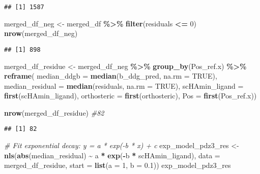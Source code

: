 \documentclass[
]{article}
\newenvironment{Shaded}{\begin{snugshade}}{\end{snugshade}}
\newcommand{\AttributeTok}[1]{\textcolor[rgb]{0.13,0.29,0.53}{#1}}
\newcommand{\CommentTok}[1]{\textcolor[rgb]{0.56,0.35,0.01}{\textit{#1}}}
\newcommand{\ConstantTok}[1]{\textcolor[rgb]{0.56,0.35,0.01}{#1}}
\newcommand{\DecValTok}[1]{\textcolor[rgb]{0.00,0.00,0.81}{#1}}
\newcommand{\FloatTok}[1]{\textcolor[rgb]{0.00,0.00,0.81}{#1}}
\newcommand{\FunctionTok}[1]{\textcolor[rgb]{0.13,0.29,0.53}{\textbf{#1}}}
\newcommand{\NormalTok}[1]{#1}
\newcommand{\OtherTok}[1]{\textcolor[rgb]{0.56,0.35,0.01}{#1}}
\newcommand{\SpecialCharTok}[1]{\textcolor[rgb]{0.81,0.36,0.00}{\textbf{#1}}}
\begin{document}
\begin{verbatim}
## [1] 1587
\end{verbatim}

\begin{Shaded}
\begin{Highlighting}[]
\NormalTok{merged\_df\_neg }\OtherTok{\textless{}{-}}\NormalTok{ merged\_df }\SpecialCharTok{\%\textgreater{}\%} \FunctionTok{filter}\NormalTok{(residuals }\SpecialCharTok{\textless{}=} \DecValTok{0}\NormalTok{)}
\FunctionTok{nrow}\NormalTok{(merged\_df\_neg)}
\end{Highlighting}
\end{Shaded}

\begin{verbatim}
## [1] 898
\end{verbatim}

\begin{Shaded}
\begin{Highlighting}[]
\NormalTok{merged\_df\_residue }\OtherTok{\textless{}{-}}\NormalTok{ merged\_df\_neg }\SpecialCharTok{\%\textgreater{}\%}
  \FunctionTok{group\_by}\NormalTok{(Pos\_ref.x) }\SpecialCharTok{\%\textgreater{}\%}
  \FunctionTok{reframe}\NormalTok{(}
    \AttributeTok{median\_ddgb =} \FunctionTok{median}\NormalTok{(b\_ddg\_pred, }\AttributeTok{na.rm =} \ConstantTok{TRUE}\NormalTok{),}
    \AttributeTok{median\_residual =} \FunctionTok{median}\NormalTok{(residuals, }\AttributeTok{na.rm =} \ConstantTok{TRUE}\NormalTok{),}
    \AttributeTok{scHAmin\_ligand =} \FunctionTok{first}\NormalTok{(scHAmin\_ligand),}
    \AttributeTok{orthosteric =} \FunctionTok{first}\NormalTok{(orthosteric),}
    \AttributeTok{Pos =} \FunctionTok{first}\NormalTok{(Pos\_ref.x))}

\FunctionTok{nrow}\NormalTok{(merged\_df\_residue) }\CommentTok{\#82}
\end{Highlighting}
\end{Shaded}

\begin{verbatim}
## [1] 82
\end{verbatim}

\begin{Shaded}
\begin{Highlighting}[]
\CommentTok{\# Fit exponential decay: y = a * exp({-}b * x) + c}
\NormalTok{exp\_model\_pdz3\_res }\OtherTok{\textless{}{-}} \FunctionTok{nls}\NormalTok{(}\FunctionTok{abs}\NormalTok{(median\_residual) }\SpecialCharTok{\textasciitilde{}}\NormalTok{ a }\SpecialCharTok{*} \FunctionTok{exp}\NormalTok{(}\SpecialCharTok{{-}}\NormalTok{b }\SpecialCharTok{*}\NormalTok{ scHAmin\_ligand),}
                 \AttributeTok{data =}\NormalTok{ merged\_df\_residue,}
                 \AttributeTok{start =} \FunctionTok{list}\NormalTok{(}\AttributeTok{a =} \DecValTok{1}\NormalTok{, }\AttributeTok{b =} \FloatTok{0.1}\NormalTok{))}
\NormalTok{exp\_model\_pdz3\_res}
\end{Highlighting}
\end{Shaded}
\end{document}
